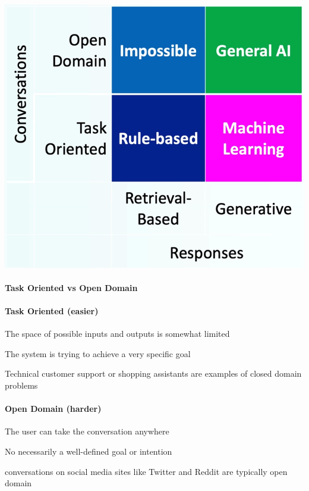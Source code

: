 \documentclass[10pt]{report}
\begin{document}
\begin{center}
	\includegraphics[scale=0.33]{115.png}
\end{center}

\paragraph{Task Oriented vs Open Domain}
\begin{multicols}{2}
\paragraph{Task Oriented (easier)}
\begin{list}{}{}
	\item The space of possible inputs and outputs is somewhat limited
	\item The system is trying to achieve a very specific goal
	\item Technical customer support or shopping assistants are examples of closed domain problems
\end{list}
\columnbreak
\paragraph{Open Domain (harder)}
\begin{list}{}{}
	\item The user can take the conversation anywhere
	\item No necessarily a well-defined goal or intention
	\item conversations on social media sites like Twitter and Reddit are typically open domain
\end{list}
\end{multicols}
\end{document}
